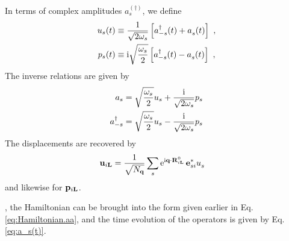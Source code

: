 In terms of complex amplitudes $a^{(\dagger)}_s$, we define
\begin{subequations}
	\label{eq:u_s.amplitudes.periodic}
	\begin{align}
	u_s (t) 
	&\equiv \frac{1}{\sqrt{2 \omega_{s}}} \left[ \D a_{-s} (t) + \fD a_s (t) \right]~, \\
	p_s (t) 
	&\equiv \im \sqrt{\frac{\omega_s}{2}} \left[ \D a_{-s} (t) - \fD a_s (t) \right]~,
	\end{align}
\end{subequations}
The inverse relations are given by
\begin{subequations}
	\label{eq:a(q)}
	\begin{align}
	a_s
	&= \sqrt{\frac{\omega_s}{2}} u_s + \frac{{\rm i}}{\sqrt{2 \omega_s}} p_s \\
	a^\dagger_{-s}
	&= \sqrt{\frac{\omega_s}{2}} u_s - \frac{{\rm i}}{\sqrt{2 \omega_s}} p_s
	\end{align}
\end{subequations}
The displacements are recovered by
\begin{align}
\b u_{i \b L}
&= \frac{1}{\sqrt{N_{\b q}}} \sum_{s} {\rm e}^{\im  \b q \cdot \b R^0_{i \b L}} \, \b e^\ast_{s i} \fD u_s
\label{eq:u_iL}
\end{align}
and likewise for ${\bf p}_{i {\bf L}}$.

, the Hamiltonian can be brought into the form given earlier in Eq.\,\eqref{eq:Hamiltonian.aa}, and the time evolution of the operators is given by Eq.\,\eqref{eq:a_s(t)}.